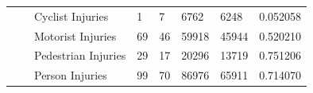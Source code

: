 \documentclass[10pt,journal,compsoc]{IEEEtran}
\begin{document}
\begin{table}[]
\begin{tabular}{|l|l|l|l|l|l|l|l|}
                                               &                             & Cyclist Injuries    & 1         & 7        & 6762       & 6248      & 0.052058 \\ \cline{3-8} 
                                               &                             & Motorist Injuries   & 69        & 46       & 59918      & 45944     & 0.520210 \\ \cline{3-8} 
                                               &                             & Pedestrian Injuries & 29        & 17       & 20296      & 13719     & 0.751206 \\ \cline{3-8} 
                                               &                             & Person Injuries     & 99        & 70       & 86976      & 65911     & 0.714070 \\ \hline
\end{tabular}
\end{table}
\end{document}
